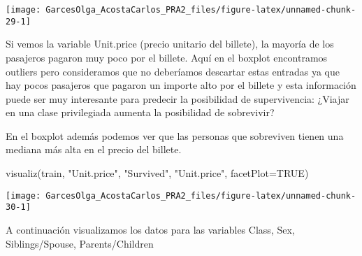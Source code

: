 \documentclass[
]{article}
\newenvironment{Shaded}{\begin{snugshade}}{\end{snugshade}}
\newcommand{\DataTypeTok}[1]{\textcolor[rgb]{0.87,0.87,0.75}{#1}}
\newcommand{\KeywordTok}[1]{\textcolor[rgb]{0.94,0.87,0.69}{#1}}
\newcommand{\NormalTok}[1]{\textcolor[rgb]{0.80,0.80,0.80}{#1}}
\newcommand{\OtherTok}[1]{\textcolor[rgb]{0.94,0.94,0.56}{#1}}
\newcommand{\StringTok}[1]{\textcolor[rgb]{0.80,0.58,0.58}{#1}}
\begin{document}
\begin{center}\texttt{[image: GarcesOlga\_AcostaCarlos\_PRA2\_files/figure-latex/unnamed-chunk-29-1]} \end{center}

Si vemos la variable Unit.price (precio unitario del billete), la
mayoría de los pasajeros pagaron muy poco por el billete. Aquí en el
boxplot encontramos outliers pero consideramos que no deberíamos
descartar estas entradas ya que hay pocos pasajeros que pagaron un
importe alto por el billete y esta información puede ser muy interesante
para predecir la posibilidad de supervivencia: ¿Viajar en una clase
privilegiada aumenta la posibilidad de sobrevivir?

En el boxplot además podemos ver que las personas que sobreviven tienen
una mediana más alta en el precio del billete.

\begin{Shaded}
\begin{Highlighting}[]
\KeywordTok{visualiz}\NormalTok{(train, }\StringTok{"Unit.price"}\NormalTok{, }\StringTok{"Survived"}\NormalTok{, }\StringTok{"Unit.price"}\NormalTok{, }\DataTypeTok{facetPlot=}\OtherTok{TRUE}\NormalTok{)}
\end{Highlighting}
\end{Shaded}

\begin{center}\texttt{[image: GarcesOlga\_AcostaCarlos\_PRA2\_files/figure-latex/unnamed-chunk-30-1]} \end{center}

A continuación visualizamos los datos para las variables Class, Sex,
Siblings/Spouse, Parents/Children
\end{document}
